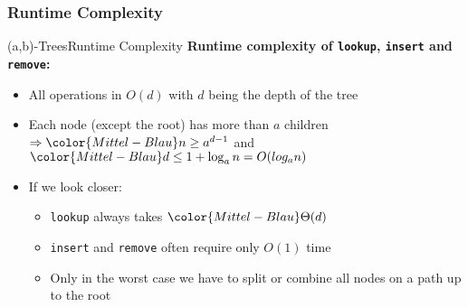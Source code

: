 
\subsubsection{Runtime Complexity}

\begin{frame}{(a,b)-Trees}{Runtime Complexity}
  \textbf{Runtime complexity of \texttt{\color{Mittel-Blau}lookup},
    \texttt{\color{Mittel-Blau}insert} and \texttt{\color{Mittel-Blau}remove}:}
  \begin{itemize}
    \item<2->
      All operations in {\color{Mittel-Blau}$O(d)$} with
      {\color{Mittel-Blau}$d$} being the depth of the tree
    \item<3->
      Each node (except the root) has more than {\color{Mittel-Blau}$a$}
      children\\
      \begin{math}
        \Rightarrow
        \color{Mittel-Blau}
        n \geq a^{d-1}
      \end{math}
      and
      \begin{math}
        \color{Mittel-Blau}
        d \leq 1 + \log_a n = O(log_a n)
      \end{math}
    \item<4->
      If we look closer:
      \begin{itemize}
        \item<5->
          \texttt{\color{Mittel-Blau}lookup} always takes
          \begin{math}
            \color{Mittel-Blau}
            \Theta(d)
          \end{math}
        \item<6->
          \texttt{\color{Mittel-Blau}insert} and
          \texttt{\color{Mittel-Blau}remove}
          often require only {\color{Mittel-Blau}$O(1)$} time
        \item<7->
          Only in the {\color{Mittel-Blau}worst case} we have to
          {\color{Mittel-Blau}split} or
          {\color{Mittel-Blau}combine} all nodes on a path up to the root
      \end{itemize}
  \end{itemize}
\end{frame}


